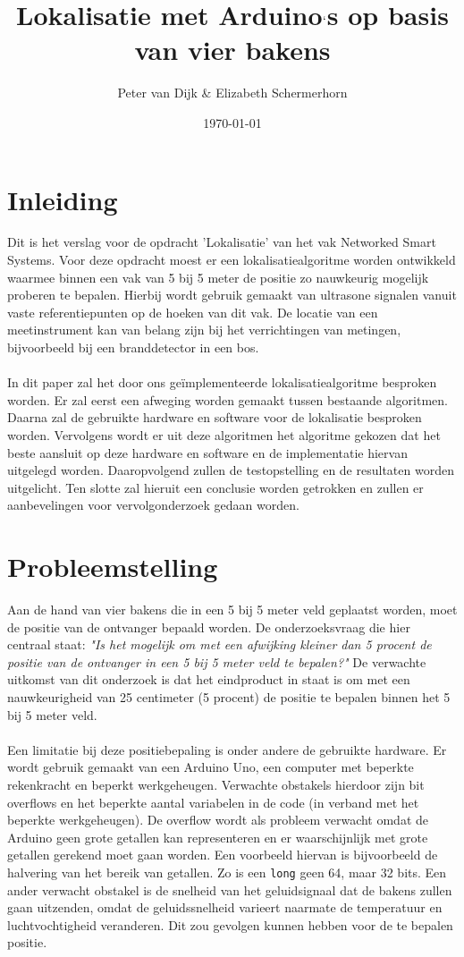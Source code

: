 \documentclass{article}
\author{Peter van Dijk \& Elizabeth Schermerhorn}
\date{\today}
\title{Lokalisatie met Arduino$`$s op basis van vier bakens}
\begin{document}
\maketitle
\newpage
\tableofcontents
\clearpage
\section{Inleiding}
Dit is het verslag voor de opdracht 'Lokalisatie' van het vak Networked Smart Systems. Voor deze opdracht moest er een lokalisatiealgoritme worden ontwikkeld waarmee binnen een vak van 5 bij 5 meter de positie zo nauwkeurig mogelijk proberen te bepalen. Hierbij wordt gebruik gemaakt van ultrasone signalen vanuit vaste referentiepunten op de hoeken van dit vak. De locatie van een meetinstrument kan van belang zijn bij het verrichtingen van metingen, bijvoorbeeld bij een branddetector in een bos. \\
\\
In dit paper zal het door ons ge\"{i}mplementeerde lokalisatiealgoritme besproken worden. Er zal eerst een afweging worden gemaakt tussen bestaande algoritmen. Daarna zal de gebruikte hardware en software voor de lokalisatie besproken worden. Vervolgens wordt er uit deze algoritmen het algoritme gekozen dat het beste aansluit op deze hardware en software en de implementatie hiervan uitgelegd worden. Daaropvolgend zullen de testopstelling en de resultaten worden uitgelicht. Ten slotte zal hieruit een conclusie worden getrokken en zullen er aanbevelingen voor vervolgonderzoek gedaan worden.


\section{Probleemstelling}
Aan de hand van vier bakens die in een 5 bij 5 meter veld geplaatst worden, moet de positie van de ontvanger bepaald worden. De onderzoeksvraag die hier centraal staat: \textit{"Is het mogelijk om met een afwijking kleiner dan 5 procent de positie van de ontvanger in een 5 bij 5 meter veld te bepalen?"}
De verwachte uitkomst van dit onderzoek is dat het eindproduct in staat is om met een nauwkeurigheid van 25 centimeter (5 procent) de positie te bepalen binnen het 5 bij 5 meter veld. \\
\\
Een limitatie bij deze positiebepaling is onder andere de gebruikte hardware. Er wordt gebruik gemaakt van een Arduino Uno, een computer met beperkte rekenkracht en beperkt werkgeheugen. 
Verwachte obstakels hierdoor zijn bit overflows en het beperkte aantal variabelen in de code (in verband met het beperkte werkgeheugen). De overflow wordt als probleem verwacht omdat de Arduino geen grote getallen kan representeren en er waarschijnlijk met grote getallen gerekend moet gaan worden. Een voorbeeld hiervan is bijvoorbeeld de halvering van het bereik van getallen. Zo is een \texttt{long} geen 64, maar 32 bits.\cite{long} Een ander verwacht obstakel is de snelheid van het geluidsignaal dat de bakens zullen gaan uitzenden, omdat de geluidssnelheid varieert naarmate de temperatuur en luchtvochtigheid veranderen. Dit zou gevolgen kunnen hebben voor de te bepalen positie.  
\end{document}
